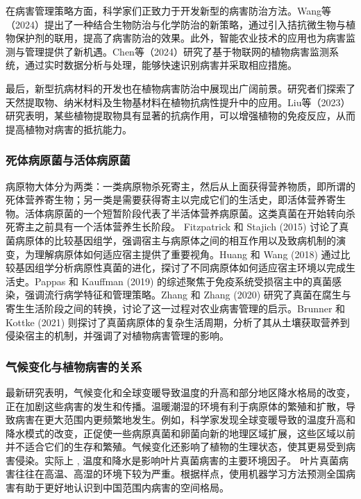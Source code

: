 \documentclass{article}
\begin{document}
在病害管理策略方面，科学家们正致力于开发新型的病害防治方法。Wang等（2024）提出了一种结合生物防治与化学防治的新策略，通过引入拮抗微生物与植物保护剂的联用，提高了病害防治的效果\cite{Wang2024}。此外，智能农业技术的应用也为病害监测与管理提供了新机遇。Chen等（2024）研究了基于物联网的植物病害监测系统，通过实时数据分析与处理，能够快速识别病害并采取相应措施\cite{Chen2024}。

最后，新型抗病材料的开发也在植物病害防治中展现出广阔前景。研究者们探索了天然提取物、纳米材料及生物基材料在植物抗病性提升中的应用。Liu等（2023）研究表明，某些植物提取物具有显著的抗病作用，可以增强植物的免疫反应，从而提高植物对病害的抵抗能力\cite{Liu2023}。
	
	\subsubsection{ 死体病原菌与活体病原菌}
病原物大体分为两类：一类病原物杀死寄主，然后从上面获得营养物质，即所谓的死体营养寄生物；另一类是需要获得寄主以完成它们的生活史，即活体营养寄生物。活体病原菌的一个短暂阶段代表了半活体营养病原菌。这类真菌在开始转向杀死寄主之前具有一个活体营养生长阶段。
Fitzpatrick 和 Stajich (2015) 讨论了真菌病原体的比较基因组学，强调宿主与病原体之间的相互作用以及致病机制的演变，为理解病原体如何适应宿主提供了重要视角\cite{Fitzpatrick2015}。Huang 和 Wang (2018) 通过比较基因组学分析病原性真菌的进化，探讨了不同病原体如何适应宿主环境以完成生活史\cite{Huang2018}。Pappas 和 Kauffman (2019) 的综述聚焦于免疫系统受损宿主中的真菌感染，强调流行病学特征和管理策略\cite{Pappas2019}。Zhang 和 Zhang (2020) 研究了真菌在腐生与寄生生活阶段之间的转换，讨论了这一过程对农业病害管理的启示\cite{Zhang2020}。Brunner 和 Kottke (2021) 则探讨了真菌病原体的复杂生活周期，分析了其从土壤获取营养到侵染宿主的机制，并强调了对植物病害管理的影响\cite{Brunner2021}。
	\subsubsection{气候变化与植物病害的关系}
	
	最新研究表明，气候变化和全球变暖导致温度的升高和部分地区降水格局的改变，正在加剧这些病害的发生和传播。温暖潮湿的环境有利于病原体的繁殖和扩散，导致病害在更大范围内更频繁地发生。例如，科学家发现全球变暖导致的温度升高和降水模式的改变，正促使一些病原真菌和卵菌向新的地理区域扩展，这些区域以前并不适合它们的生存和繁殖。气候变化还影响了植物的生理状态，使其更易受到病害侵染。实际上 , 温度和降水是影响叶片真菌病害的主要环境因子。 叶片真菌病害往往在高温、高湿的环境下较为严重。根据样点，使用机器学习方法预测全国病害有助于更好地认识到中国范围内病害的空间格局。
	
\end{document}
